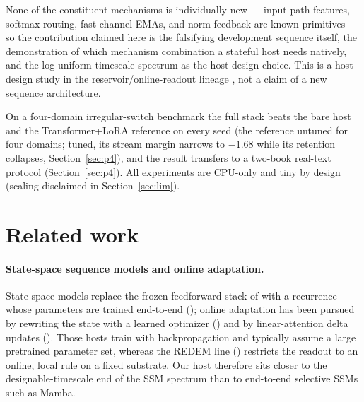 \documentclass[preprint,12pt]{elsarticle}
\begin{document}
None of the constituent mechanisms is individually new --- input-path
features, softmax routing, fast-channel EMAs, and norm feedback are
known primitives --- so the contribution claimed here is the
falsifying development sequence itself, the demonstration of which
mechanism combination a stateful host needs natively, and the
log-uniform timescale spectrum as the host-design choice. This is a
host-design study in the reservoir/online-readout lineage
\cite{jaeger2001esn,jaeger2004science,maass2002lsm}, not a claim of a
new sequence architecture.

On a four-domain irregular-switch benchmark the full stack beats the
bare host and the Transformer+LoRA reference on every seed (the
reference untuned for four domains; tuned, its stream margin narrows
to $-1.68$ while its retention collapses, Section~\ref{sec:p4}), and
the result transfers to a two-book real-text protocol
(Section~\ref{sec:p4}). All experiments are CPU-only and tiny by
design (scaling disclaimed in Section~\ref{sec:lim}).

\section{Related work}
\label{sec:related}

\paragraph{State-space sequence models and online adaptation.}
State-space models replace the frozen feedforward stack of
\cite{vaswani2017} with a recurrence whose parameters are trained
end-to-end (\cite{gu2022s4,gu2023mamba,liu2025longhorn,behrouz2025titans});
online adaptation has been pursued by rewriting the state with a learned
optimizer (\cite{sun2024ttt}) and by linear-attention delta updates
(\cite{yang2024deltanet}). Those hosts train with backpropagation and
typically assume a large pretrained parameter set, whereas the REDEM
line (\cite{redema,redemb,redemc}) restricts the readout to an online,
local rule on a fixed substrate. Our host therefore sits closer to the
designable-timescale end of the SSM spectrum than to end-to-end
selective SSMs such as Mamba.
\end{document}

